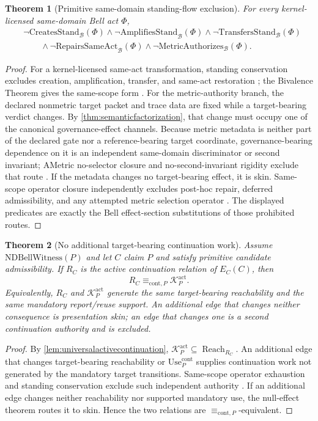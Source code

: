 \documentclass[11pt]{article}
\newtheorem{theorem}{Theorem}[section]
\theoremstyle{definition}
\newcommand{\Bell}{\mathcal{B}}
\newcommand{\NDBell}{\mathrm{NDBellWitness}}
\newcommand{\CreatesStand}{\mathrm{CreatesStand}_{\Bell}}
\newcommand{\AmplifiesStand}{\mathrm{AmplifiesStand}_{\Bell}}
\newcommand{\TransfersStand}{\mathrm{TransfersStand}_{\Bell}}
\newcommand{\RepairsAct}{\mathrm{RepairsSameAct}_{\Bell}}
\newcommand{\MetricAuth}{\mathrm{MetricAuthorizes}_{\Bell}}
\newcommand{\Active}{\mathrm{act}}
\newcommand{\ContEq}{\equiv_{\mathrm{cont},P}}
\newcommand{\ContUse}{\mathrm{Use}^{\mathrm{cont}}_{P}}
\begin{document}
\begin{theorem}[Primitive same-domain standing-flow exclusion]\label{thm:primitivenotransfer}
For every kernel-licensed same-domain Bell act $\Phi$,
\[
\begin{aligned}
&\neg\CreatesStand(\Phi)\wedge\neg\AmplifiesStand(\Phi)
 \wedge\neg\TransfersStand(\Phi)\\
&\qquad\wedge\neg\RepairsAct(\Phi)\wedge\neg\MetricAuth(\Phi).
\end{aligned}
\]
\end{theorem}
\begin{proof}
For a kernel-licensed same-act transformation, standing conservation excludes creation, amplification, transfer, and same-act restoration \cite[Theorem~6.15]{MaleyKernel2026}; the Bivalence Theorem gives the same-scope form \cite[Theorem~3.6]{MaleyBivalence2026}. For the metric-authority branch, the declared nonmetric target packet and trace data are fixed while a target-bearing verdict changes. By \cref{thm:semanticfactorization}, that change must occupy one of the canonical governance-effect channels. Because metric metadata is neither part of the declared gate nor a reference-bearing target coordinate, governance-bearing dependence on it is an independent same-domain discriminator or second invariant; AMetric no-selector closure and no-second-invariant rigidity exclude that route \cite[Theorem~2.5]{MaleyAMetricBoundary2026}\cite[Theorem~3.4]{MaleyBivalence2026}. If the metadata changes no target-bearing effect, it is skin. Same-scope operator closure independently excludes post-hoc repair, deferred admissibility, and any attempted metric selection operator \cite[Corollaries~3.11--3.12 and Proposition~5.2]{MaleySameScope2026}. The displayed predicates are exactly the Bell effect-section substitutions of those prohibited routes.
\end{proof}

\begin{theorem}[No additional target-bearing continuation work]\label{thm:noextracontinuation}
Assume $\NDBell(P)$ and let $C$ claim $P$ and satisfy primitive candidate admissibility. If $R_C$ is the active continuation relation of $E_C(C)$, then
\[
R_C\ContEq\mathcal K_P^{\Active}.
\]
Equivalently, $R_C$ and $\mathcal K_P^{\Active}$ generate the same target-bearing reachability and the same mandatory report/reuse support. An additional edge that changes neither consequence is presentation skin; an edge that changes one is a second continuation authority and is excluded.
\end{theorem}
\begin{proof}
By \cref{lem:universalactivecontinuation}, $\mathcal K_P^{\Active}\subseteq\operatorname{Reach}_{R_C}$. An additional edge that changes target-bearing reachability or $\ContUse$ supplies continuation work not generated by the mandatory target transitions. Same-scope operator exhaustion and standing conservation exclude such independent authority \cite[Theorem~4.5]{MaleySameScope2026}\cite[Theorems~3.6 and~4.2]{MaleyBivalence2026}. If an additional edge changes neither reachability nor supported mandatory use, the null-effect theorem routes it to skin. Hence the two relations are $\ContEq$-equivalent.
\end{proof}
\end{document}
